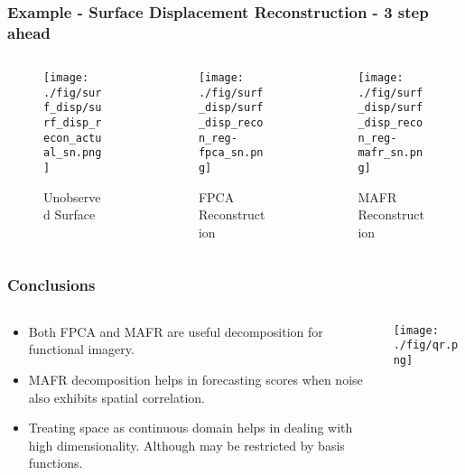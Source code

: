\documentclass[aspectratio=169]{beamer}
\begin{document}
  \begin{frame}
    \frametitle{Example - Surface Displacement Reconstruction - 3 step ahead}
    \begin{columns}[t]
      \begin{column}{.33\textwidth}
      \begin{figure}
        \texttt{[image: ./fig/surf\_disp/surf\_disp\_recon\_actual\_sn.png]}
      \caption{Unobserved Surface}
      \end{figure}
      \end{column}
      \begin{column}{.33\textwidth}
      \begin{figure}
      \texttt{[image: ./fig/surf\_disp/surf\_disp\_recon\_reg-fpca\_sn.png]}
      \caption{FPCA Reconstruction}
      \end{figure}
      \end{column}
      \begin{column}{.33\textwidth}
      \begin{figure}
      \texttt{[image: ./fig/surf\_disp/surf\_disp\_recon\_reg-mafr\_sn.png]}
      \caption{MAFR Reconstruction}
      \end{figure}
      \end{column}
    \end{columns}
  \end{frame}
  

  \begin{frame}
    \frametitle{Conclusions}
    \begin{columns}
      \begin{column}{0.5\textwidth}
        \begin{itemize}
          \item Both FPCA and MAFR are useful decomposition for functional imagery.
          \item MAFR decomposition helps in forecasting scores when noise also exhibits spatial correlation. 
          \item Treating space as continuous domain helps in dealing with high dimensionality. Although may be restricted by basis functions. 
        \end{itemize}
      \end{column}
      \begin{column}{0.5\textwidth}
        \begin{center}
          \texttt{[image: ./fig/qr.png]}
        \end{center}
      \end{column}
    \end{columns}
    
  \end{frame}
  
\end{document}
